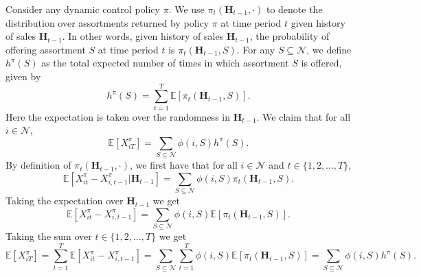 \documentclass[mnsc,non-blindrev]{informs3}
\theoremstyle{definition}
\begin{document}
\begin{appendices}{\Large{}}
Consider any dynamic control policy $\pi$. We use $\pi_t(\bm{H}_{t-1},\cdot)$ to denote the distribution over assortments returned by policy $\pi$ at time period $t$ given history of sales $\bm{H}_{t-1}$. In other words, given history of sales $\bm{H}_{t-1}$, the probability of offering assortment $S$ at time period $t$ is $\pi_t(\bm{H}_{t-1},S)$. For any $S\subseteq\mathcal{N}$, we define $h^\pi(S)$ as the total expected number of times in which assortment $S$ is offered, given by
\begin{equation*}
h^\pi(S)=\sum_{t=1}^T\mathbb{E}[\pi_t(\bm{H}_{t-1},S)].
\end{equation*}
Here the expectation is taken over the randomness in $\bm{H}_{t-1}$. We claim that for all $i\in\mathcal{N}$,
\begin{equation}\label{eq:expected_sales}
\mathbb{E}[X_{iT}^\pi]=\sum_{S\subseteq\mathcal{N}}\phi(i,S)h^\pi(S).
\end{equation}
By definition of $\pi_t(\bm{H}_{t-1},\cdot)$, we first have that for all $i\in\mathcal{N}$ and $t\in\{1,2,\dots,T\}$,
\begin{equation*}
\mathbb{E}[X^\pi_{it}-X^\pi_{i,t-1}|\bm{H}_{t-1}]=\sum_{S\subseteq\mathcal{N}}\phi(i,S)\pi_t(\bm{H}_{t-1},S).
\end{equation*}
Taking the expectation over $\bm{H}_{t-1}$ we get
\begin{equation*}
\mathbb{E}[X^\pi_{it}-X_{i,t-1}^\pi]=\sum_{S\subseteq\mathcal{N}}\phi(i,S)\mathbb{E}[\pi_t(\bm{H}_{t-1},S)].
\end{equation*}
Taking the sum over $t\in\{1,2,\dots,T\}$ we get
\begin{equation*}
\mathbb{E}[X_{iT}^\pi]=\sum_{t=1}^T\mathbb{E}[X_{it}^\pi-X_{i,t-1}^\pi]=\sum_{S\subseteq\mathcal{N}}\sum_{t=1}^T\phi(i,S)\mathbb{E}[\pi_t(\bm{H}_{t-1},S)]=\sum_{S\subseteq\mathcal{N}}\phi(i,S)h^\pi(S).
\end{equation*}


\end{appendices}
\end{document}
